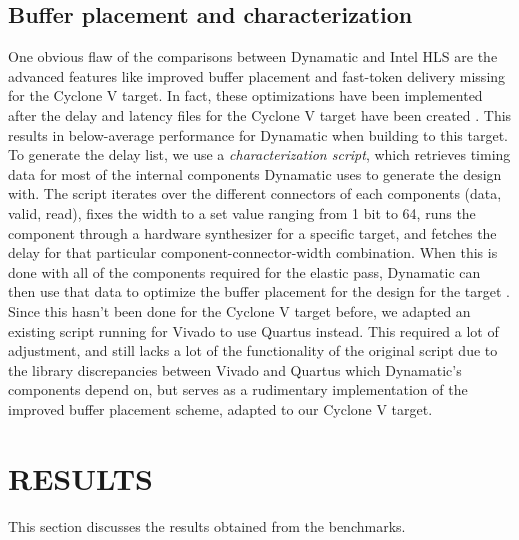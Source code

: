 \documentclass[final,5p,times,twocolumn]{elsarticle}
\begin{document}
\begin{spacing}{1.125}
\subsection{Buffer placement and characterization}

One obvious flaw of the comparisons between Dynamatic and Intel HLS are the advanced features like improved buffer placement and fast-token delivery missing for the Cyclone V target. In fact, these optimizations have been implemented after the delay and latency files for the Cyclone V target have been created \cite{dyn_repository}. This results in below-average performance for Dynamatic when building to this target. To generate the delay list, we use a \textit{characterization script}, which retrieves timing data for most of the internal components Dynamatic uses to generate the design with. The script iterates over the different connectors of each components (data, valid, read), fixes the width to a set value ranging from 1 bit to 64, runs the component through a hardware synthesizer for a specific target, and fetches the delay for that particular component-connector-width combination. When this is done with all of the components required for the elastic pass, Dynamatic can then use that data to optimize the buffer placement for the design for the target \cite{buffers}. Since this hasn't been done for the Cyclone V target before, we adapted an existing script running for Vivado to use Quartus instead. This required a lot of adjustment, and still lacks a lot of the functionality of the original script due to the library discrepancies between Vivado and Quartus which Dynamatic's components depend on, but serves as a rudimentary implementation of the improved buffer placement scheme, adapted to our Cyclone V target.

\section{RESULTS}

This section discusses the results obtained from the benchmarks. 


\end{spacing}
\end{document}
